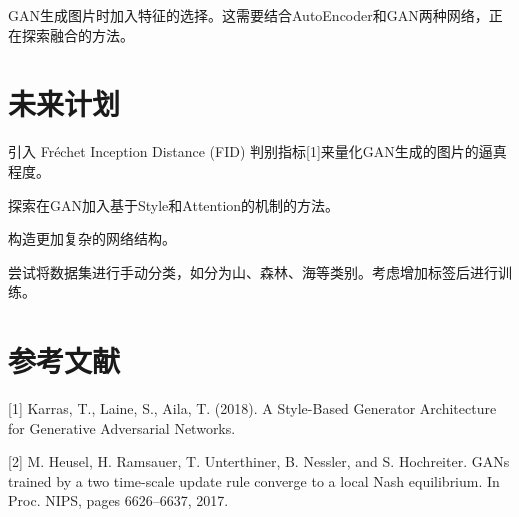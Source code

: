 \documentclass{article}
\begin{document}
\begin{CJK*}{UTF8}{gbsn}
GAN生成图片时加入特征的选择。这需要结合AutoEncoder和GAN两种网络，正在探索融合的方法。


\section{未来计划}

引入 Fr\'{e}chet Inception Distance (FID) 判别指标[1]来量化GAN生成的图片的逼真程度。

探索在GAN加入基于Style和Attention的机制的方法。

构造更加复杂的网络结构。

尝试将数据集进行手动分类，如分为山、森林、海等类别。考虑增加标签后进行训练。

\section*{参考文献}

\small

[1] Karras, T., Laine, S., Aila, T. (2018). A Style-Based Generator Architecture for Generative Adversarial Networks. 

[2] M. Heusel, H. Ramsauer, T. Unterthiner, B. Nessler, and S. Hochreiter. GANs trained by a two time-scale update rule converge to a local Nash equilibrium. In Proc. NIPS, pages 6626–6637, 2017.


\end{CJK*}
\end{document}
